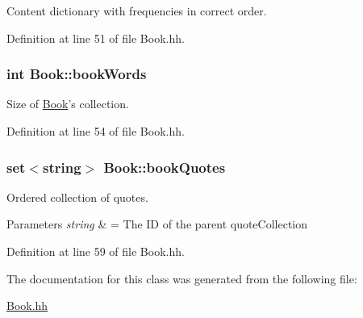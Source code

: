 Content dictionary with frequencies in correct order. 



Definition at line 51 of file Book.\-hh.

\hypertarget{class_book_a36f1e0b30a0ad17606976556cab45a23}{
\subsubsection[{book\-Words}]{\setlength{\rightskip}{0pt plus 5cm}int Book\-::book\-Words\hspace{0.3cm}{\ttfamily [private]}}}\label{class_book_a36f1e0b30a0ad17606976556cab45a23}


Size of \hyperlink{class_book}{Book}'s collection. 



Definition at line 54 of file Book.\-hh.

\hypertarget{class_book_a370478eab144c20de936e1b68923e1c0}{
\subsubsection[{book\-Quotes}]{\setlength{\rightskip}{0pt plus 5cm}set$<$string$>$ Book\-::book\-Quotes\hspace{0.3cm}{\ttfamily [private]}}}\label{class_book_a370478eab144c20de936e1b68923e1c0}


Ordered collection of quotes. 


\begin{DoxyParams}{Parameters}
{\em string} & = The I\-D of the parent quote\-Collection \\
\hline
\end{DoxyParams}


Definition at line 59 of file Book.\-hh.



The documentation for this class was generated from the following file\-:\begin{DoxyCompactItemize}
\item 
\hyperlink{_book_8hh}{Book.\-hh}\end{DoxyCompactItemize}
